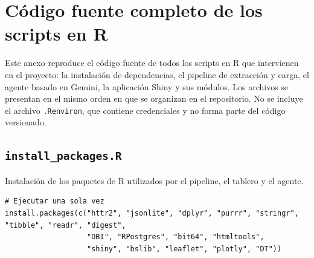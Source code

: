 %
%
%

\section{Código fuente completo de los scripts en R}
\label{anexo:codigo-r}

Este anexo reproduce el código fuente de todos los scripts en R que intervienen en el proyecto: la instalación de dependencias, el pipeline de extracción y carga, el agente basado en Gemini, la aplicación Shiny y sus módulos. Los archivos se presentan en el mismo orden en que se organizan en el repositorio. No se incluye el archivo \texttt{.Renviron}, que contiene credenciales y no forma parte del código versionado.


\subsection{\texttt{install\_packages.R}}
Instalación de los paquetes de R utilizados por el pipeline, el tablero y el agente.
\begin{lstlisting}[style=anexoR]
# Ejecutar una sola vez
install.packages(c("httr2", "jsonlite", "dplyr", "purrr", "stringr", "tibble", "readr", "digest",
                   "DBI", "RPostgres", "bit64", "htmltools",
                   "shiny", "bslib", "leaflet", "plotly", "DT"))
\end{lstlisting}


